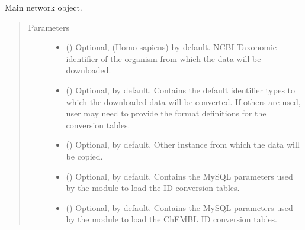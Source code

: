 \documentclass[letterpaper,10pt,english]{sphinxmanual}
\begin{document}
\begin{fulllineitems}
\label{\detokenize{reference:pypath.main.PyPath}}
Main network object.
\begin{quote}\begin{description}
\item[{Parameters}] \leavevmode\begin{itemize}
\item {} 
 () \textendash{} Optional,  (Homo sapiens) by default. NCBI Taxonomic
identifier of the organism from which the data will be
downloaded.

\item {} 
 () \textendash{} Optional,  by default. Contains
the default identifier types to which the downloaded data will
be converted. If others are used, user may need to provide the
format definitions for the conversion tables.

\item {} 
 ({\hyperref[\detokenize{reference:pypath.main.PyPath}]{}}) \textendash{} Optional,  by default. Other
{\hyperref[\detokenize{reference:pypath.main.PyPath}]{}} instance from which the data will
be copied.

\item {} 
 () \textendash{} Optional,  by default. Contains the MySQL
parameters used by the  module to load
the ID conversion tables.

\item {} 
 () \textendash{} Optional,  by default. Contains the MySQL
parameters used by the  module to load
the ChEMBL ID conversion tables.


\end{itemize}
\end{description}
\end{quote}
\end{fulllineitems}
\end{document}

